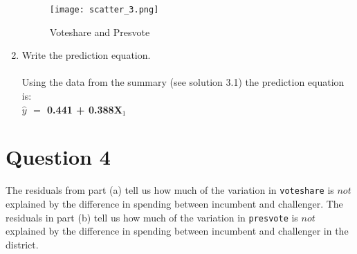 \documentclass[12pt,letterpaper]{article}
\begin{document}
\begin{enumerate}
\begin{figure}[h!]
	\caption{\footnotesize{Voteshare and Presvote}}
	\vspace{.2cm}
	\centering
	\label{fig:}
	\texttt{[image: scatter\_3.png]}
\end{figure}		
			
			\vspace{1cm}
		\item Write the prediction equation.\\\\
			Using the data from the summary (see solution 3.1) the prediction equation is:\\ 
		\textbf{$\hat{y}$ $=$ 0.441 + 0.388X$_1$}
\end{enumerate}
	

\newpage	
\section*{Question 4}
\noindent The residuals from part (a) tell us how much of the variation in \texttt{voteshare} is $not$ explained by the difference in spending between incumbent and challenger. The residuals in part (b) tell us how much of the variation in \texttt{presvote} is $not$ explained by the difference in spending between incumbent and challenger in the district.
\end{document}
